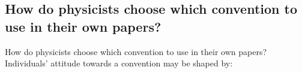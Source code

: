 \documentclass[10pt]{beamer}
\begin{document}
\subsection{How do physicists choose which convention to use in their own papers?}

\begin{frame}{How do physicists choose which convention to use in their own papers?}
Individuals' attitude towards a convention may be shaped by:


    \begin{figure}
        \centering
        \resizebox{0.95\textwidth}{!}{}
    \end{figure}

\end{frame}
\end{document}
